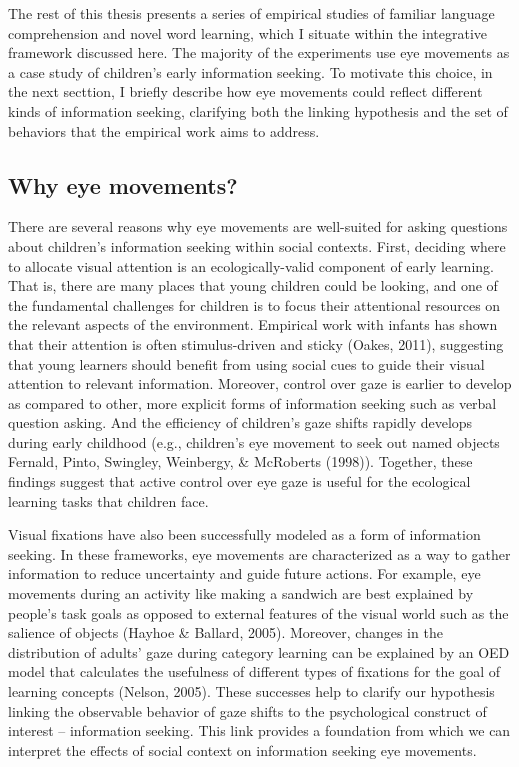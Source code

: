 \documentclass[oneside]{report}
\begin{document}
The rest of this thesis presents a series of empirical studies of
familiar language comprehension and novel word learning, which I situate
within the integrative framework discussed here. The majority of the
experiments use eye movements as a case study of children's early
information seeking. To motivate this choice, in the next secttion, I
briefly describe how eye movements could reflect different kinds of
information seeking, clarifying both the linking hypothesis and the set
of behaviors that the empirical work aims to address.

\subsection{Why eye movements?}\label{why-eye-movements}

There are several reasons why eye movements are well-suited for asking
questions about children's information seeking within social contexts.
First, deciding where to allocate visual attention is an
ecologically-valid component of early learning. That is, there are many
places that young children could be looking, and one of the fundamental
challenges for children is to focus their attentional resources on the
relevant aspects of the environment. Empirical work with infants has
shown that their attention is often stimulus-driven and sticky (Oakes,
2011), suggesting that young learners should benefit from using social
cues to guide their visual attention to relevant information. Moreover,
control over gaze is earlier to develop as compared to other, more
explicit forms of information seeking such as verbal question asking.
And the efficiency of children's gaze shifts rapidly develops during
early childhood (e.g., children's eye movement to seek out named objects
Fernald, Pinto, Swingley, Weinbergy, \& McRoberts (1998)). Together,
these findings suggest that active control over eye gaze is useful for
the ecological learning tasks that children face.

Visual fixations have also been successfully modeled as a form of
information seeking. In these frameworks, eye movements are
characterized as a way to gather information to reduce uncertainty and
guide future actions. For example, eye movements during an activity like
making a sandwich are best explained by people's task goals as opposed
to external features of the visual world such as the salience of objects
(Hayhoe \& Ballard, 2005). Moreover, changes in the distribution of
adults' gaze during category learning can be explained by an OED model
that calculates the usefulness of different types of fixations for the
goal of learning concepts (Nelson, 2005). These successes help to
clarify our hypothesis linking the observable behavior of gaze shifts to
the psychological construct of interest -- information seeking. This
link provides a foundation from which we can interpret the effects of
social context on information seeking eye movements.
\end{document}
